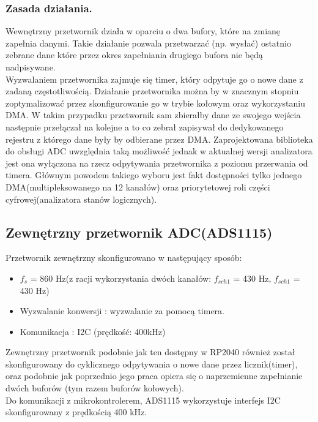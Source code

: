 \subsubsection{Zasada działania.}
Wewnętrzny przetwornik działa w oparciu o dwa bufory, które na zmianę zapełnia danymi. Takie 
działanie pozwala przetwarzać (np. wysłać) ostatnio zebrane dane które przez okres 
zapełniania drugiego bufora nie będą nadpisywane.\\
\indent Wyzwalaniem przetwornika zajmuje się timer, który odpytuje go o nowe dane z zadaną częstotliwością.
Działanie przetwornika można by w znacznym stopniu zoptymalizować przez skonfigurowanie go w 
trybie kołowym oraz wykorzystaniu DMA. W takim przypadku przetwornik sam zbierałby dane ze swojego
wejścia następnie przełączał na kolejne a to co zebrał zapisywał do dedykowanego rejestru z którego dane
były by odbierane przez DMA. Zaprojektowana biblioteka do obsługi ADC uwzględnia taką możliwość
jednak w aktualnej wersji analizatora jest ona wyłączona na rzecz odpytywania przetwornika z poziomu
przerwania od timera. Głównym powodem takiego wyboru jest fakt dostępności tylko jednego 
DMA(multipleksowanego na 12 kanałów) oraz priorytetowej roli części cyfrowej(analizatora stanów
logicznych).


\subsection{Zewnętrzny przetwornik ADC(ADS1115)}
Przetwornik zewnętrzny skonfigurowano w następujący sposób:
\begin{itemize}
    \item $f_{s}$ = 860 Hz(z racji wykorzystania dwóch kanałów: $f_{sch1}$ = 430 Hz, $f_{sch1}$ = 430 Hz)
    \item Wyzwalanie konwersji : wyzwalanie za pomocą timera. 
    \item Komunikacja : I2C (prędkość: 400kHz)
\end{itemize}

\indent Zewnętrzny przetwornik podobnie jak ten dostępny w RP2040 również został skonfigurowany do cyklicznego 
odpytywania o nowe dane przez licznik(timer), oraz podobnie jak poprzednio jego praca opiera się o 
naprzemienne zapełnianie dwóch buforów (tym razem buforów kołowych). \\
\indent Do komunikacji z mikrokontrolerem, ADS1115 wykorzystuje interfejs I2C skonfigurowany
z prędkością 400 kHz.


